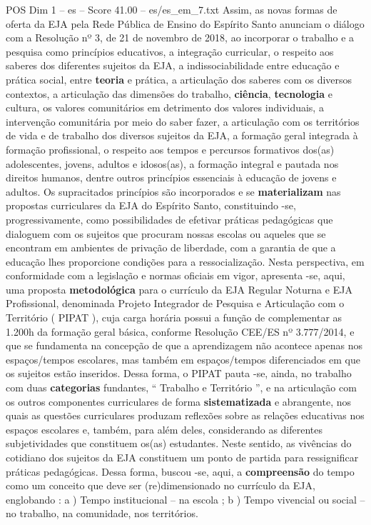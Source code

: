 \begin{textsample}{POS Dim 1 – es – Score 41.00 – es/es\_em\_7.txt}
Assim, as novas formas de oferta da EJA pela Rede Pública de Ensino do Espírito Santo anunciam o diálogo com a Resolução nº 3, de 21 de novembro de 2018, ao incorporar o trabalho e a pesquisa como princípios educativos, a integração curricular, o respeito aos saberes dos diferentes sujeitos da EJA, a indissociabilidade entre educação e prática social, entre \textbf{teoria} e prática, a articulação dos saberes com os diversos contextos, a articulação das dimensões do trabalho, \textbf{ciência}, \textbf{tecnologia} e cultura, os valores comunitários em detrimento dos valores individuais, a intervenção comunitária por meio do saber fazer, a articulação com os territórios de vida e de trabalho dos diversos sujeitos da EJA, a formação geral integrada à formação profissional, o respeito aos tempos e percursos formativos dos(as) adolescentes, jovens, adultos e idosos(as), a formação integral e pautada nos direitos humanos, dentre outros princípios essenciais à educação de jovens e adultos.
Os supracitados princípios são incorporados e se \textbf{materializam} nas propostas curriculares da EJA do Espírito Santo, constituindo -se, progressivamente, como possibilidades de efetivar práticas pedagógicas que dialoguem com os sujeitos que procuram nossas escolas ou aqueles que se encontram em ambientes de privação de liberdade, com a garantia de que a educação lhes proporcione condições para a ressocialização.
Nesta perspectiva, em conformidade com a legislação e normas oficiais em vigor, apresenta -se, aqui, uma proposta \textbf{metodológica} para o currículo da EJA Regular Noturna e EJA Profissional, denominada Projeto Integrador de Pesquisa e Articulação com o Território ( PIPAT ), cuja carga horária possui a função de complementar as 1.200h da formação geral básica, conforme Resolução CEE/ES nº 3.777/2014, e que se fundamenta na concepção de que a aprendizagem não acontece apenas nos espaços/tempos escolares, mas também em espaços/tempos diferenciados em que os sujeitos estão inseridos.
Dessa forma, o PIPAT pauta -se, ainda, no trabalho com duas \textbf{categorias} fundantes, “ Trabalho e Território ”, e na articulação com os outros componentes curriculares de forma \textbf{sistematizada} e abrangente, nos quais as questões curriculares produzam reflexões sobre as relações educativas nos espaços escolares e, também, para além deles, considerando as diferentes subjetividades que constituem os(as) estudantes.
Neste sentido, as vivências do cotidiano dos sujeitos da EJA constituem um ponto de partida para ressignificar práticas pedagógicas.
Dessa forma, buscou -se, aqui, a \textbf{compreensão} do tempo como um conceito que deve ser (re)dimensionado no currículo da EJA, englobando : a ) Tempo institucional – na escola ; b ) Tempo vivencial ou social – no trabalho, na comunidade, nos territórios.

\end{textsample}
